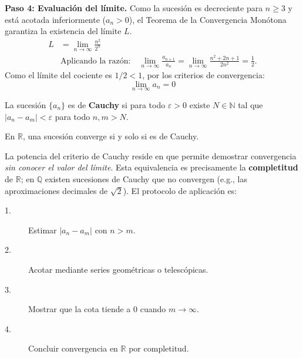 \begin{example}
\begin{myproof}
\textbf{Paso 4: Evaluación del límite.}
Como la sucesión es decreciente para $n \geq 3$ y está acotada inferiormente ($a_n > 0$), el Teorema de la Convergencia Monótona garantiza la existencia del límite $L$.
\begin{align*}
    L &= \lim_{n \to \infty} \frac{n^2}{2^n} \\
    &\text{Aplicando la razón:} \quad \lim_{n \to \infty} \frac{a_{n+1}}{a_n} = \lim_{n \to \infty} \frac{n^2 + 2n + 1}{2n^2} = \frac{1}{2}.
\end{align*}
Como el límite del cociente es $1/2 < 1$, por los criterios de convergencia:
\[
\boxed{\lim_{n \to \infty} a_n = 0}
\]
\end{myproof}
\end{example}

\begin{definition}
La sucesión $\{a_n\}$ es de \textbf{Cauchy} si para todo $\varepsilon > 0$
existe $N \in \mathbb{N}$ tal que $|a_n - a_m| < \varepsilon$ para todo
$n, m > N$.
\end{definition}

\begin{theorem}
En $\mathbb{R}$, una sucesión converge si y solo si es de Cauchy.
\end{theorem}

\begin{rem}
La potencia del criterio de Cauchy reside en que permite demostrar
convergencia \emph{sin conocer el valor del límite}. Esta equivalencia es
precisamente la \textbf{completitud} de $\mathbb{R}$; en $\mathbb{Q}$
existen sucesiones de Cauchy que no convergen (e.g., las aproximaciones
decimales de $\sqrt{2}$). El protocolo de aplicación es:
\begin{description}
  \item[1.] Estimar $|a_n - a_m|$ con $n > m$.
  \item[2.] Acotar mediante series geométricas o telescópicas.
  \item[3.] Mostrar que la cota tiende a $0$ cuando $m \to \infty$.
  \item[4.] Concluir convergencia en $\mathbb{R}$ por completitud.
\end{description}
\end{rem}

